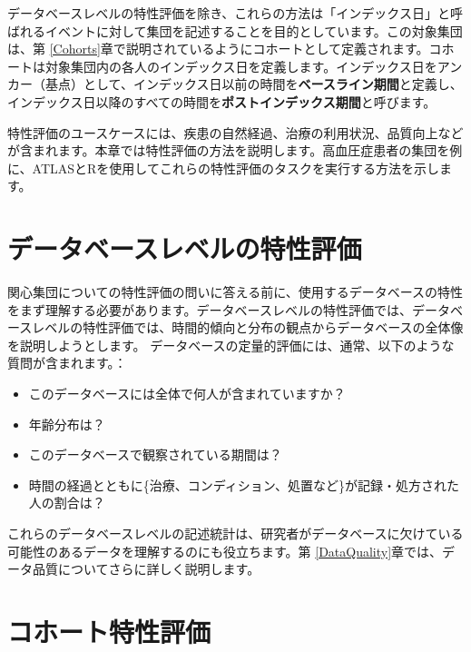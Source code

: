 \documentclass[
  11pt]{book}
\theoremstyle{definition}
\theoremstyle{definition}
\theoremstyle{definition}
\theoremstyle{definition}
\theoremstyle{remark}
\begin{document}
データベースレベルの特性評価を除き、これらの方法は「インデックス日」と呼ばれるイベントに対して集団を記述することを目的としています。この対象集団は、第 \ref{Cohorts}章で説明されているようにコホートとして定義されます。コホートは対象集団内の各人のインデックス日を定義します。インデックス日をアンカー（基点）として、インデックス日以前の時間を\textbf{ベースライン期間}と定義し、インデックス日以降のすべての時間を\textbf{ポストインデックス期間}と呼びます。

特性評価のユースケースには、疾患の自然経過、治療の利用状況、品質向上などが含まれます。本章では特性評価の方法を説明します。高血圧症患者の集団を例に、ATLASとRを使用してこれらの特性評価のタスクを実行する方法を示します。       

\section{データベースレベルの特性評価}\label{ux30c7ux30fcux30bfux30d9ux30fcux30b9ux30ecux30d9ux30ebux306eux7279ux6027ux8a55ux4fa1}

関心集団についての特性評価の問いに答える前に、使用するデータベースの特性をまず理解する必要があります。データベースレベルの特性評価では、データベースレベルの特性評価では、時間的傾向と分布の観点からデータベースの全体像を説明しようとします。 データベースの定量的評価には、通常、以下のような質問が含まれます。：

\begin{itemize}
\item
  このデータベースには全体で何人が含まれていますか？
\item
  年齢分布は？
\item
  このデータベースで観察されている期間は？
\item
  時間の経過とともに\{治療、コンディション、処置など\}が記録・処方された人の割合は？
\end{itemize}

これらのデータベースレベルの記述統計は、研究者がデータベースに欠けている可能性のあるデータを理解するのにも役立ちます。第 \ref{DataQuality}章では、データ品質についてさらに詳しく説明します。 

\section{コホート特性評価}\label{ux30b3ux30dbux30fcux30c8ux7279ux6027ux8a55ux4fa1}
\end{document}
